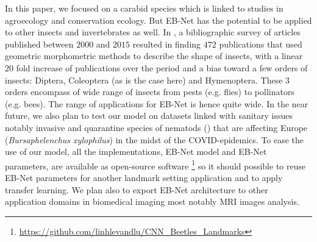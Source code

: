\documentclass[review]{elsarticle}
\begin{document}
In this paper, we focused on a carabid species which is linked to studies in agroecology and conservation ecology. But EB-Net has the potential to be applied to other insects and invertebrates as well. In \cite{tatsuta_geometric_2018}, a bibliographic survey of articles published between $2000$ and $2015$ resulted in finding $472$ publications that used geometric morphometric methods to describe the shape of insects, with a linear $20$ fold increase of publications over the period and a bias toward a few orders of insects: Diptera, Coleoptera (as is the case here) and Hymenoptera. These $3$ orders encompass of wide range of insects from pests (e.g. flies) to pollinators (e.g. bees). The range of applications for EB-Net is hence quite wide. In the near future, we also plan to test our model on datasets linked with sanitary issues notably invasive and quarantine species of nematods (\cite{thevenoux2020hidden}) that are affecting Europe (\textit{Bursaphelenchus xylophilus}) in the midst of the COVID-epidemics. 
To ease the use of our model, all the implementations, EB-Net model and EB-Net parameters, are available as open-source software \footnote{\url{ https://github.com/linhlevandlu/CNN_Beetles_Landmarks}} so it should possible to reuse EB-Net parameters for another landmark setting application and to apply transfer learning. We plan also to export EB-Net architecture to other application domains in biomedical imaging most notably MRI images analysis. 


\end{document}
